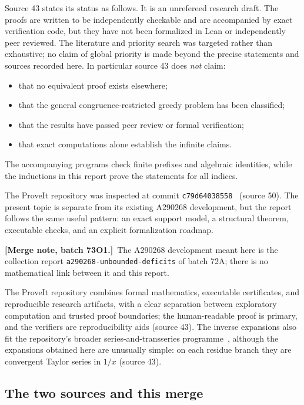 \documentclass[11pt,a4paper]{article}
\numberwithin{equation}{section}
\theoremstyle{definition}
\theoremstyle{remark}
\theoremstyle{plain}
\newcommand{\mergenote}[1]{\par\smallskip\noindent\textbf{[Merge note, batch 73O1.]}\ #1\par\smallskip}
\newcommand{\src}[1]{\textup{(source #1)}}
\begin{document}
Source 43 states its status as follows.  It is an unrefereed research draft.
The proofs are written to be independently checkable and are accompanied by
exact verification code, but they have not been formalized in Lean or
independently peer reviewed.  The literature and priority search was targeted
rather than exhaustive; no claim of global priority is made beyond the precise
statements and sources recorded here.  In particular source 43 does
\emph{not} claim:
\begin{itemize}
\item that no equivalent proof exists elsewhere;
\item that the general congruence-restricted greedy problem has been classified;
\item that the results have passed peer review or formal verification;
\item that exact computations alone establish the infinite claims.
\end{itemize}
The accompanying programs check finite prefixes and algebraic identities,
while the inductions in this report prove the statements for all indices.

The ProveIt repository was inspected at commit
\texttt{c79d64038558}~\cite{ProveIt} \src{50}.  The present topic is
separate from its existing A290268 development, but the report follows the
same useful pattern: an exact support model, a structural theorem, executable
checks, and an explicit formalization roadmap.
\mergenote{The A290268 development meant here is the collection report
\texttt{a290268-unbounded-deficits} of batch 72A; there is no mathematical
link between it and this report.}
The ProveIt repository combines formal mathematics, executable certificates,
and reproducible research artifacts, with a clear separation between
exploratory computation and trusted proof boundaries; the human-readable proof
is primary, and the verifiers are reproducibility aids \src{43}.  The inverse
expansions also fit the repository's broader series-and-transseries
programme~\cite{ProveItTransseries}, although the expansions obtained here are
unusually simple: on each residue branch they are convergent Taylor series in
$1/x$ \src{43}.

\subsection{The two sources and this merge}\label{gdf:sec:merge}
\end{document}
